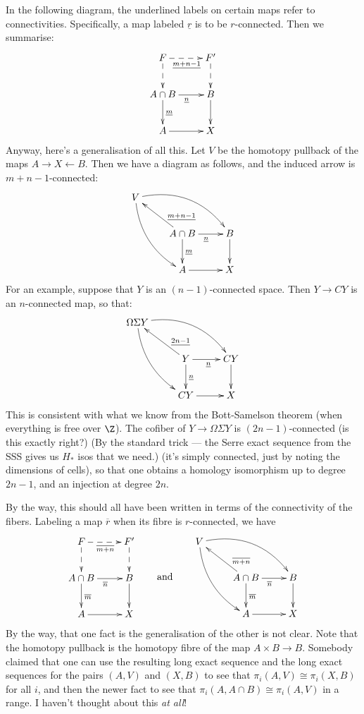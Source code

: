 \documentclass[11pt]{article}
\begin{document}
In the following diagram, the underlined labels on certain maps refer to
connectivities. Specifically, a map labeled $\underline r$ is to be
$r$-connected. Then we summarise:
\[\xymatrix{
F\ar@{-->}[r]_{\underline{m+n-1}}\ar@{-->}[d]&F'\ar@{-->}[d]\\
A\cap B\ar[d]^{\underline{m}}\ar[r]_{\underline{{n}}}&B\ar[d]\\
A\ar[r]&X
}\]
Anyway, here's a generalisation of all this. Let $V$ be the homotopy pullback of
the maps $A\rightarrow X\leftarrow B$. Then we have a diagram as follows, and
the induced arrow is $m+n-1$-connected:
\[\xymatrix{
V\ar@/_1pc/[ddr]\ar@/^1.5pc/[rrd]\\
&A\cap B\ar[ul]_(.3){\underline{m+n-1}}\ar[d]^{\underline{m}}
\ar[r]_{\underline{{n}}}&B\ar[d]\\
&A\ar[r]&X
}\]
For an example, suppose that $Y$ is an $(n-1)$-connected space. Then $Y\to CY$
is an $n$-connected map, so that:
\[\xymatrix{
\Omega\Sigma Y\ar@/_1pc/[ddr]\ar@/^1.5pc/[rrd]\\
&Y\ar[ul]_(.3){\underline{2n-1}}\ar[d]^{\underline{n}}
\ar[r]_{\underline{{n}}}&CY\ar[d]\\
&CY\ar[r]&X
}\]
This is consistent with what we know from the Bott-Samelson theorem (when
everything is free over $\Z$). The cofiber of $Y\to \Omega\Sigma Y$ is
$(2n-1)$-connected (is this exactly right?) (By the standard trick --- the Serre
exact sequence from the SSS gives us $H_*$ isos that we need.) (it's simply
connected, just by noting the dimensions of cells), so that one obtains a
homology isomorphism up to degree $2n-1$, and an injection at degree $2n$.

By the way, this should all have been written in terms of the connectivity of
the fibers. Labeling a map $\overline r$ when its fibre is $r$-connected, we
have
\[
\xymatrix{
F\ar@{-->}[r]_{\overline{m+n}}\ar@{-->}[d]&F'\ar@{-->}[d]\\
A\cap B\ar[d]^{\overline{m}}\ar[r]_{\overline{{n}}}&B\ar[d]\\
A\ar[r]&X
}\raisebox{-1.26cm}{\qquad and\qquad }\xymatrix{
V\ar@/_1pc/[ddr]\ar@/^1.5pc/[rrd]\\
&A\cap B\ar[ul]_(.3){\overline{m+n}}\ar[d]^{\overline{m}}
\ar[r]_{\overline{{n}}}&B\ar[d]\\
&A\ar[r]&X
}\]
By the way, that one fact is the generalisation of the other is not clear. Note
that the homotopy pullback is the homotopy fibre of the map $A\times B\to B$.
Somebody claimed that one can use the resulting long exact sequence and the long
exact sequences for the pairs $(A,V)$ and $(X,B)$ to see that
$\pi_i(A,V)\cong\pi_i(X,B)$ for all $i$, and then the newer fact to see that
$\pi_i(A,A\cap B)\cong\pi_i(A,V)$ in a range. I haven't thought about this
\emph{at all}!
\end{document}
